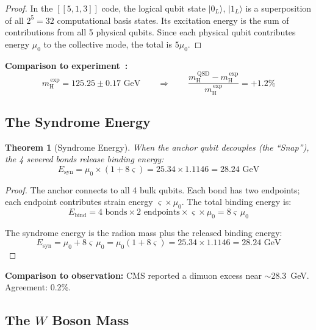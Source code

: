 \documentclass[11pt,a4paper]{article}
\newtheorem{theorem}{Theorem}[section]
\theoremstyle{definition}
\theoremstyle{remark}
\newcommand{\gs}{\varsigma}
\newcommand{\murad}{\mu_0}
\newcommand{\Esyn}{E_{\mathrm{syn}}}
\newcommand{\mH}{m_\mathrm{H}}
\begin{document}
\begin{proof}
In the $[[5,1,3]]$ code, the logical qubit state $|0_L\rangle$, $|1_L\rangle$ is a superposition of all $2^5 = 32$ computational basis states. Its excitation energy is the sum of contributions from all 5 physical qubits. Since each physical qubit contributes energy $\murad$ to the collective mode, the total is $5\murad$.
\end{proof}

\textbf{Comparison to experiment~\cite{PDG2022}:}
\begin{equation}
\mH^{\,\mathrm{exp}} = 125.25 \pm 0.17 \text{ GeV} \qquad \Rightarrow \qquad \frac{\mH^{\,\mathrm{QSD}} - \mH^{\,\mathrm{exp}}}{\mH^{\,\mathrm{exp}}} = +1.2\%
\end{equation}

\subsection{The Syndrome Energy}

\begin{theorem}[Syndrome Energy]
\label{thm:syndrome}
When the anchor qubit decouples (the ``Snap''), the 4 severed bonds release binding energy:
\begin{equation}
\boxed{\Esyn = \murad \times (1 + 8\gs) = 25.34 \times 1.1146 = 28.24 \text{ GeV}}
\end{equation}
\end{theorem}

\begin{proof}
The anchor connects to all 4 bulk qubits. Each bond has two endpoints; each endpoint contributes strain energy $\gs \times \murad$. The total binding energy is:
\begin{equation}
E_{\mathrm{bind}} = 4 \text{ bonds} \times 2 \text{ endpoints} \times \gs \times \murad = 8\gs \, \murad
\end{equation}

The syndrome energy is the radion mass plus the released binding energy:
\begin{equation}
\Esyn = \murad + 8\gs \, \murad = \murad(1 + 8\gs) = 25.34 \times 1.1146 = 28.24 \text{ GeV}
\end{equation}
\end{proof}

\textbf{Comparison to observation:} CMS reported a dimuon excess near $\sim$28.3~GeV. Agreement: 0.2\%.

\subsection{The $W$ Boson Mass}
\end{document}
